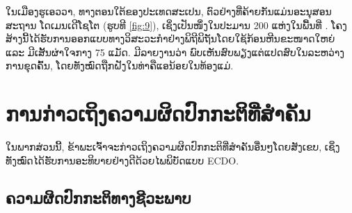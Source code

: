 \documentclass[10pt,twocolumn,letterpaper]{article}
\begin{document}
ໃນເມືອງຮູເອວວາ, ທາງຕອນໃຕ້ຂອງປະເທດສະເປນ, ຕົວຢ່າງທີ່ຄ້າຍກັນແມ່ນອະນຸສອນສະຖານ ໂດເມນເດີໂຊໂຕ (ຮູບທີ \ref{fig:9}), ເຊິ່ງເປັນໜຶ່ງໃນປະມານ 200 ແຫ່ງໃນພື້ນທີ່ \cite{72,32}. ໂຄງສ້າງນີ້ໄດ້ຮັບການອອກແບບທາງວິສະວະກຳຢ່າງພິຖີພິຖັນໂດຍໃຊ້ກ້ອນຫີນຂະໜາດໃຫຍ່ ແລະ ມີເສັ້ນຜ່າໃຈກາງ 75 ແມັດ. ມີລາຍງານວ່າ ພົບເຫັນສົບພຽງແຕ່ແປດສົບໃນລະຫວ່າງການຂຸດຄົ້ນ, ໂດຍທັງໝົດຖືກຝັງໃນທ່າຄືແອນ້ອຍໃນທ້ອງແມ່.

\section{ການກ່າວເຖິງຄວາມຜິດປົກກະຕິທີ່ສຳຄັນ}

ໃນພາກສ່ວນນີ້, ຂ້າພະເຈົ້າຈະກ່າວເຖິງຄວາມຜິດປົກກະຕິທີ່ສຳຄັນອື່ນໆໂດຍສັງເຂບ, ເຊິ່ງທັງໝົດໄດ້ຮັບການອະທິບາຍຢ່າງດີດ້ວຍໄພພິບັດແບບ ECDO.

\subsection{ຄວາມຜິດປົກກະຕິທາງຊີວະພາບ}
\end{document}
